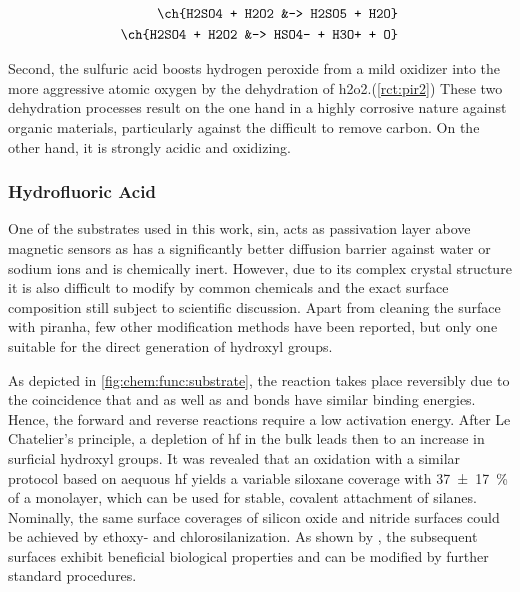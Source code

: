\begin{align}
	\ch{H2SO4 + H2O2 &-> H2SO5 + H2O} \label{rct:pir1}\\
	\ch{H2SO4 + H2O2 &-> HSO4- + H3O+ + O} \label{rct:pir2}
\end{align}

Second, the sulfuric acid boosts hydrogen peroxide from a mild oxidizer into the more aggressive atomic oxygen by the dehydration of \gls{h2o2}.(\cref{rct:pir2})  These two dehydration processes result on the one hand in a highly corrosive nature against organic materials, particularly against the difficult to remove carbon. On the other hand, it is strongly acidic and oxidizing.

\subsubsection{Hydrofluoric Acid}

One of the substrates used in this work, \gls{sin}, acts as passivation layer above magnetic sensors as has a significantly better diffusion barrier against water or sodium ions and is chemically inert.\cite{lit:chem:sin:surface} However, due to its complex crystal structure it is also difficult to modify by common chemicals and the exact surface composition still subject to scientific discussion.\cite{lit:chem:sin:etchingcontrol} Apart from cleaning the surface with piranha, few other modification methods have been reported, but only one suitable for the direct generation of \gls{hydroxyl} groups.\cite{lit:chem:sin:etchingcontrol, lit:chem:sin:biofunc, lit:chem:sin:langeDiss, lit:chem:sin:modforFoodapps}

As depicted in \cref{fig:chem:func:substrate}, the reaction  takes place reversibly due to the coincidence that  and  as well as  and  bonds have similar binding energies. Hence, the forward and reverse reactions require a low activation energy. After Le Chatelier's principle, a depletion of \gls{hf} in the bulk leads then to an increase in surficial hydroxyl groups.\cite{lit:chem:sin:SiFSiOH} It was revealed that an oxidation with a similar protocol based on aequous \gls{hf} yields a variable \gls{siloxane} coverage with \SI{37(17)}{\percent} of a monolayer, which can be used for stable, covalent attachment of silanes. Nominally, the same surface coverages of silicon oxide and nitride surfaces could be achieved by ethoxy- and chlorosilanization.\cite{lit:chem:sin:surfacEtchingandMod} As shown by \citet{lit:chem:sin:silane}, the subsequent surfaces exhibit beneficial biological properties and can be modified by further standard procedures.


